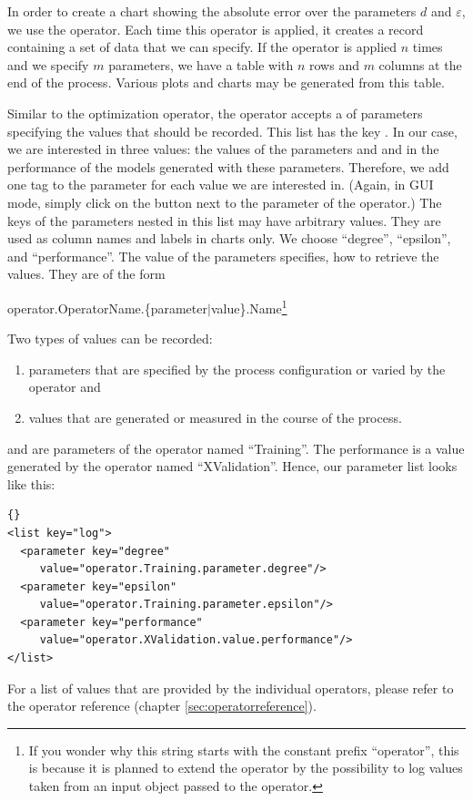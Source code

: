 In order to create a chart showing the absolute error over the parameters
$d$ and $\varepsilon$, we use the  operator. Each time
this operator is applied, it creates a record containing a set of data
that we can specify. If the operator is applied $n$ times and we
specify $m$ parameters, we have a table with $n$ rows and $m$ columns
at the end of the process. Various plots and charts may be
generated from this table.

Similar to the optimization operator, the  operator
accepts a  of parameters specifying the values that should
be recorded. This list has the key .
In our case, we are interested in three values: the values
of the parameters  and  and in the
performance of the models generated with these parameters. Therefore,
we add one  tag to the  parameter
 for each value we are interested in. (Again, in GUI mode,
simply click on the  button next to the
 parameter of the  operator.) The keys of
the parameters nested in this list may have arbitrary values. They are
used as column names and labels in charts only. We choose ``degree'',
``epsilon'', and ``performance''. The value of the parameters
specifies, how to retrieve the values. They are of the form
\begin{center}
operator.OperatorName.\{parameter$|$value\}.Name\footnote{If you
  wonder why this string starts with the constant prefix ``operator'',
  this is because it is planned to extend the 
  operator by the possibility to log values taken from an input object
  passed to the operator.}
\end{center}
Two types of values can be recorded:
\begin{enumerate}
\item parameters that are specified by the process configuration or
  varied by the  operator and
\item values that are generated or measured in the course of the process.
\end{enumerate}
 and  are parameters of the operator named
``Training''. The performance is a value generated by the operator named
``XValidation''. Hence, our parameter list looks like this:
\medskip

\begin{lstlisting}[style=rapidminerxmlstyle]{}
<list key="log">
  <parameter key="degree" 
     value="operator.Training.parameter.degree"/>
  <parameter key="epsilon" 
     value="operator.Training.parameter.epsilon"/>
  <parameter key="performance" 
     value="operator.XValidation.value.performance"/>
</list>
\end{lstlisting}
For a list of values that are provided by the individual operators,
please refer to the operator reference (chapter
\ref{sec:operatorreference}).

